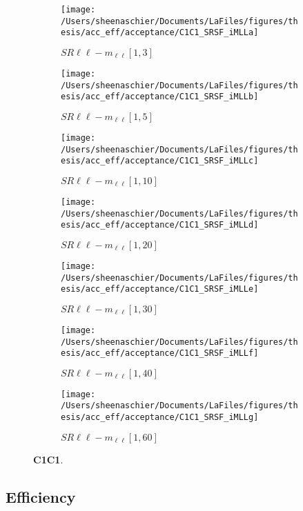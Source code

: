 \begin{figure}
        \centering
    \begin{subfigure}[b]{0.49\textwidth}
        \texttt{[image: /Users/sheenaschier/Documents/LaFiles/figures/thesis/acc\_eff/acceptance/C1C1\_SRSF\_iMLLa]}
    \caption{$SR\ell\ell-m_{\ell\ell} [1, 3]$}
    \end{subfigure}
    \begin{subfigure}[b]{0.49\textwidth}
        \texttt{[image: /Users/sheenaschier/Documents/LaFiles/figures/thesis/acc\_eff/acceptance/C1C1\_SRSF\_iMLLb]}
    \caption{$SR\ell\ell-m_{\ell\ell} [1, 5]$}
    \end{subfigure}
    \begin{subfigure}[b]{0.49\textwidth}
        \texttt{[image: /Users/sheenaschier/Documents/LaFiles/figures/thesis/acc\_eff/acceptance/C1C1\_SRSF\_iMLLc]}
    \caption{$SR\ell\ell-m_{\ell\ell} [1, 10]$}
    \end{subfigure}
    \begin{subfigure}[b]{0.49\textwidth}
        \texttt{[image: /Users/sheenaschier/Documents/LaFiles/figures/thesis/acc\_eff/acceptance/C1C1\_SRSF\_iMLLd]}
    \caption{$SR\ell\ell-m_{\ell\ell} [1, 20]$}
    \end{subfigure}
    \begin{subfigure}[b]{0.49\textwidth}
        \texttt{[image: /Users/sheenaschier/Documents/LaFiles/figures/thesis/acc\_eff/acceptance/C1C1\_SRSF\_iMLLe]}
    \caption{$SR\ell\ell-m_{\ell\ell} [1, 30]$}
    \end{subfigure}
    \begin{subfigure}[b]{0.49\textwidth}
        \texttt{[image: /Users/sheenaschier/Documents/LaFiles/figures/thesis/acc\_eff/acceptance/C1C1\_SRSF\_iMLLf]}
    \caption{$SR\ell\ell-m_{\ell\ell} [1, 40]$}
    \end{subfigure}
    \begin{subfigure}[b]{0.49\textwidth}
        \texttt{[image: /Users/sheenaschier/Documents/LaFiles/figures/thesis/acc\_eff/acceptance/C1C1\_SRSF\_iMLLg]}
    \caption{$SR\ell\ell-m_{\ell\ell} [1, 60]$}
    \end{subfigure}
    \caption{\label{fig:c1c1_truth_acceptance}\textbf{C1C1}.}
\end{figure}

\FloatBarrier

\subsection{Efficiency}

